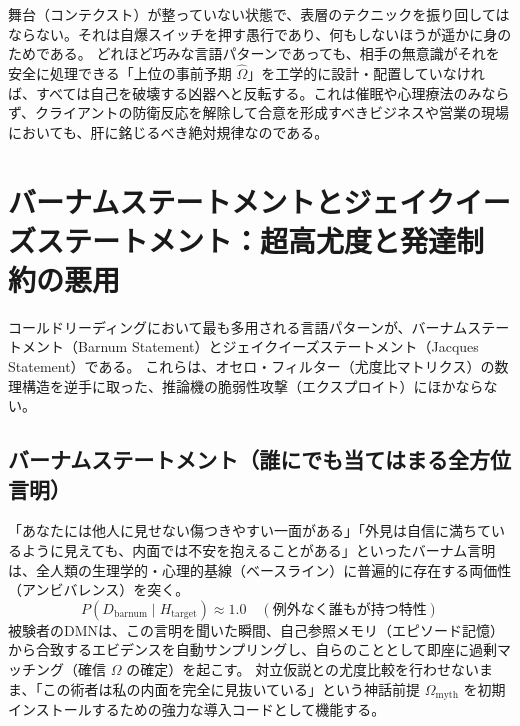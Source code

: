 舞台（コンテクスト）が整っていない状態で、表層のテクニックを振り回してはならない。それは自爆スイッチを押す愚行であり、何もしないほうが遥かに身のためである。
どれほど巧みな言語パターンであっても、相手の無意識がそれを安全に処理できる「上位の事前予期 $\hat{\Omega}$」を工学的に設計・配置していなければ、すべては自己を破壊する凶器へと反転する。これは催眠や心理療法のみならず、クライアントの防衛反応を解除して合意を形成すべきビジネスや営業の現場においても、肝に銘じるべき絶対規律なのである。

\section{バーナムステートメントとジェイクイーズステートメント：超高尤度と発達制約の悪用}

コールドリーディングにおいて最も多用される言語パターンが、バーナムステートメント（Barnum Statement）とジェイクイーズステートメント（Jacques Statement）である。
これらは、オセロ・フィルター（尤度比マトリクス）の数理構造を逆手に取った、推論機の脆弱性攻撃（エクスプロイト）にほかならない。

\subsection{バーナムステートメント（誰にでも当てはまる全方位言明）}
「あなたには他人に見せない傷つきやすい一面がある」「外見は自信に満ちているように見えても、内面では不安を抱えることがある」といったバーナム言明は、全人類の生理学的・心理的基線（ベースライン）に普遍的に存在する両価性（アンビバレンス）を突く。
\begin{equation}
    P(D_{\mathrm{barnum}} \mid H_{\mathrm{target}}) \approx 1.0 \quad (\text{例外なく誰もが持つ特性})
\end{equation}
被験者のDMNは、この言明を聞いた瞬間、自己参照メモリ（エピソード記憶）から合致するエビデンスを自動サンプリングし、自らのこととして即座に過剰マッチング（確信 $\Omega$ の確定）を起こす。
対立仮説との尤度比較を行わせないまま、「この術者は私の内面を完全に見抜いている」という神話前提 $\Omega_{\mathrm{myth}}$ を初期インストールするための強力な導入コードとして機能する。

